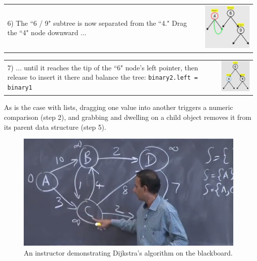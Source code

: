 \noindent \begin{tabular}{m{4.6cm} m{3.4cm}}

6) The ``6 / 9" subtree is now separated from the ``4." Drag the ``4"
node downward ...

& \includegraphics[width=3.4cm]{img/examples/bst-6.png}
\end{tabular}

\noindent \begin{tabular}{m{4.6cm} m{3.4cm}}

7) ... until it reaches the tip of the ``6" node's left pointer, then
release to insert it there and balance the tree: \texttt{binary2.left =
binary1}

& \includegraphics[width=3.4cm]{img/examples/bst-7.png}
\end{tabular}

As is the case with lists, dragging one value into another triggers a
numeric comparison (step 2), and grabbing and dwelling on a child object
removes it from its parent data structure (step 5).

\begin{figure}
\begin{center}
\includegraphics[width=0.7\columnwidth]{img/6006/dijkstra.png}
\end{center}

\caption{An instructor demonstrating Dijkstra's algorithm on the
blackboard.}

\label{fig:example-dijkstra}
\end{figure}


